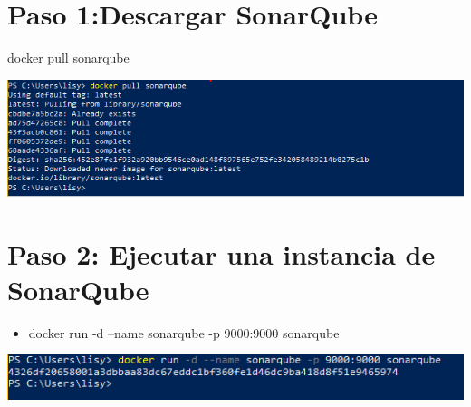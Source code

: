 \section{Paso 1:Descargar SonarQube} 
docker pull sonarqube
\begin{center}
\includegraphics[width=\columnwidth]{images/1}\newline
\end{center}
\section{Paso 2: Ejecutar una instancia de SonarQube } 
\begin{itemize}
    \item docker run -d --name sonarqube -p 9000:9000 sonarqube
\end{itemize}
\begin{center}
\includegraphics[width=\columnwidth]{images/2}\newline
\end{center}

